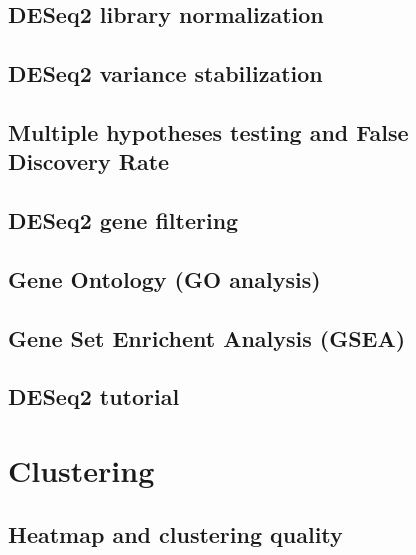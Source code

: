 \documentclass[
]{book}
\begin{document}
\hypertarget{deseq2-library-normalization}{%
\section{DESeq2 library normalization}\label{deseq2-library-normalization}}

\hypertarget{deseq2-variance-stabilization}{%
\section{DESeq2 variance stabilization}\label{deseq2-variance-stabilization}}

\hypertarget{multiple-hypotheses-testing-and-false-discovery-rate}{%
\section{Multiple hypotheses testing and False Discovery Rate}\label{multiple-hypotheses-testing-and-false-discovery-rate}}

\hypertarget{deseq2-gene-filtering}{%
\section{DESeq2 gene filtering}\label{deseq2-gene-filtering}}

\hypertarget{gene-ontology-go-analysis}{%
\section{Gene Ontology (GO analysis)}\label{gene-ontology-go-analysis}}

\hypertarget{gene-set-enrichent-analysis-gsea}{%
\section{Gene Set Enrichent Analysis (GSEA)}\label{gene-set-enrichent-analysis-gsea}}

\hypertarget{deseq2-tutorial}{%
\section{DESeq2 tutorial}\label{deseq2-tutorial}}

\hypertarget{cluster}{%
\chapter{Clustering}\label{cluster}}

\hypertarget{heatmap-and-clustering-quality}{%
\section{Heatmap and clustering quality}\label{heatmap-and-clustering-quality}}
\end{document}
